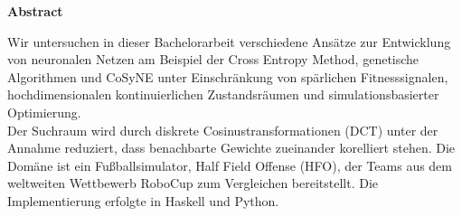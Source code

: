 %
%
\vspace*{2cm}

\begin{center}
    \textbf{Abstract}
\end{center}

\vspace*{1cm}

\noindent Wir untersuchen in dieser Bachelorarbeit verschiedene Ansätze zur Entwicklung von neuronalen Netzen am Beispiel der Cross Entropy Method, genetische Algorithmen und CoSyNE unter Einschränkung von spärlichen Fitnesssignalen, hochdimensionalen kontinuierlichen Zustandsräumen und simulationsbasierter Optimierung. \\ Der Suchraum wird durch diskrete Cosinustransformationen (DCT) unter der Annahme reduziert, dass benachbarte Gewichte zueinander korelliert stehen. Die Domäne ist ein Fußballsimulator, Half Field Offense (HFO), der Teams aus dem weltweiten Wettbewerb RoboCup zum Vergleichen bereitstellt. Die Implementierung erfolgte in Haskell und Python. 